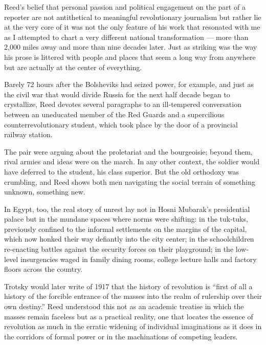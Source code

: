 Reed's belief that personal passion and political engagement on the part
of a reporter are not antithetical to meaningful revolutionary
journalism but rather lie at the very core of it was not the only
feature of his work that resonated with me as I attempted to chart a
very different national transformation --- more than 2,000 miles away
and more than nine decades later. Just as striking was the way his prose
is littered with people and places that seem a long way from anywhere
but are actually at the center of everything.

Barely 72 hours after the Bolsheviks had seized power, for example, and
just as the civil war that would divide Russia for the next half decade
began to crystallize, Reed devotes several paragraphs to an ill-tempered
conversation between an uneducated member of the Red Guards and a
supercilious counterrevolutionary student, which took place by the door
of a provincial railway station.

The pair were arguing about the proletariat and the bourgeoisie; beyond
them, rival armies and ideas were on the march. In any other context,
the soldier would have deferred to the student, his class superior. But
the old orthodoxy was crumbling, and Reed shows both men navigating the
social terrain of something unknown, something new.

In Egypt, too, the real story of unrest lay not in Hosni Mubarak's
presidential palace but in the mundane spaces where norms were shifting:
in the tuk-tuks, previously confined to the informal settlements on the
margins of the capital, which now honked their way defiantly into the
city center; in the schoolchildren re-enacting battles against the
security forces on their playground; in the low-level insurgencies waged
in family dining rooms, college lecture halls and factory floors across
the country.

Trotsky would later write of 1917 that the history of revolution is
``first of all a history of the forcible entrance of the masses into the
realm of rulership over their own destiny.'' Reed understood this not as
an academic treatise in which the masses remain faceless but as a
practical reality, one that locates the essence of revolution as much in
the erratic widening of individual imaginations as it does in the
corridors of formal power or in the machinations of competing leaders.

